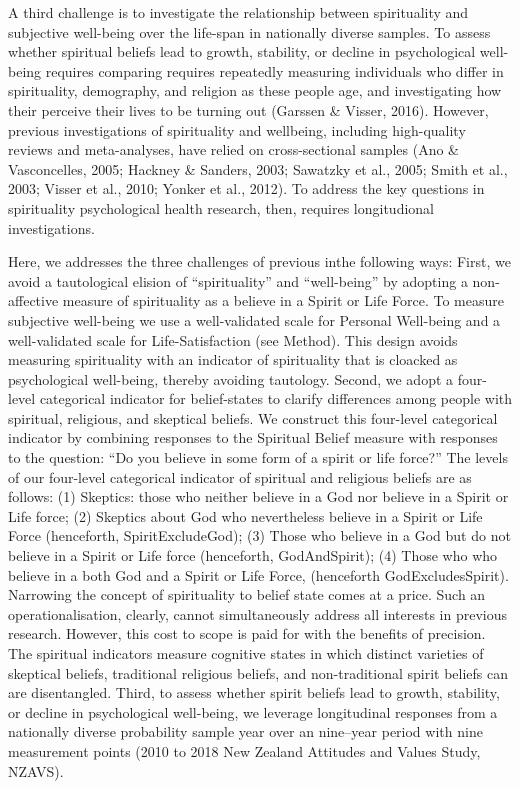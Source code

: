 \documentclass[
  english,
  man]{apa6}
\begin{document}
A third challenge is to investigate the relationship between spirituality and subjective well-being over the life-span in nationally diverse samples. To assess whether spiritual beliefs lead to growth, stability, or decline in psychological well-being requires comparing requires repeatedly measuring individuals who differ in spirituality, demography, and religion as these people age, and investigating how their perceive their lives to be turning out (Garssen \& Visser, 2016). However, previous investigations of spirituality and wellbeing, including high-quality reviews and meta-analyses, have relied on cross-sectional samples (Ano \& Vasconcelles, 2005; Hackney \& Sanders, 2003; Sawatzky et al., 2005; Smith et al., 2003; Visser et al., 2010; Yonker et al., 2012). To address the key questions in spirituality psychological health research, then, requires longitudional investigations.

Here, we addresses the three challenges of previous inthe following ways: First, we avoid a tautological elision of \enquote{spirituality} and \enquote{well-being} by adopting a non-affective measure of spirituality as a believe in a Spirit or Life Force. To measure subjective well-being we use a well-validated scale for Personal Well-being and a well-validated scale for Life-Satisfaction (see Method). This design avoids measuring spirituality with an indicator of spirituality that is cloacked as psychological well-being, thereby avoiding tautology. Second, we adopt a four-level categorical indicator for belief-states to clarify differences among people with spiritual, religious, and skeptical beliefs. We construct this four-level categorical indicator by combining responses to the Spiritual Belief measure with responses to the question: \enquote{Do you believe in some form of a spirit or life force?} The levels of our four-level categorical indicator of spiritual and religious beliefs are as follows: (1) Skeptics: those who neither believe in a God nor believe in a Spirit or Life force; (2) Skeptics about God who nevertheless believe in a Spirit or Life Force (henceforth, SpiritExcludeGod); (3) Those who believe in a God but do not believe in a Spirit or Life force (henceforth, GodAndSpirit); (4) Those who who believe in a both God and a Spirit or Life Force, (henceforth GodExcludesSpirit). Narrowing the concept of spirituality to belief state comes at a price. Such an operationalisation, clearly, cannot simultaneously address all interests in previous research. However, this cost to scope is paid for with the benefits of precision. The spiritual indicators measure cognitive states in which distinct varieties of skeptical beliefs, traditional religious beliefs, and non-traditional spirit beliefs can are disentangled. Third, to assess whether spirit beliefs lead to growth, stability, or decline in psychological well-being, we leverage longitudinal responses from a nationally diverse probability sample year over an nine--year period with nine measurement points (2010 to 2018 New Zealand Attitudes and Values Study, NZAVS).
\end{document}
